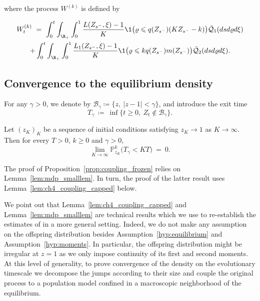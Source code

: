 \begin{refsegment}
where the process $ W^{(k)}$ is defined by

\begin{multline}\label{eq:martingale_before_cuting_in_three_parts} 
W^{(k)}_t\ =\ \int_0^t \int_{\R_+} \int_0^1 \frac{L(Z_{s^-},\xi)-1}{K}\1\big(\varrho \leqslant q({Z}_{s^-})(K{Z}_{s^-}-k)\big)\bar{\mathcal{Q}}_1( ds d\varrho d\xi)\\
   + \int_0^t \int_{\R_+} \int_0^1 \frac{L_1(Z_{s^-},\xi)-1}{K} \1\big(\varrho \leqslant k q({Z}_{s^-}) m({Z}_{s^-})\big)  \bar{\mathcal{Q}}_2( ds d\varrho d\xi).
\end{multline}


\subsection{Convergence to the equilibrium density}\label{sec:deviations}
For any $\gamma > 0$, we denote by $\mathscr{B}_{\gamma} \coloneqq \{z,\ |z-1|<\gamma\}$, and introduce the exit time
\begin{equation}\label{eq:stopping_times}
      T_{\gamma} \ \coloneqq\ \inf\big\{t\geqslant 0,\ {Z}_t\notin \mathscr{B}_{\gamma}\big\}.
\end{equation}

\begin{prop}\label{prop:coupling_frozen}
Let $(z_K)_{K}$ be a sequence of initial conditions satisfying $z_K\to 1$ as $K\to\infty$. Then for every $T>0$, $k\geqslant 0$ and $\gamma>0$,
\begin{equation*}
    \lim_{K\to\infty}\mathbb{P}^k_{z_K}(T_{\gamma}<KT\big)\  =\ 0.
\end{equation*}
\end{prop} 



The proof of Proposition~\ref{prop:coupling_frozen} relies on Lemma~\ref{lem:mdp_smalllem}. 
In turn, the proof of the latter result uses Lemma~\ref{lem:ch4_coupling_capped} below.
\begin{rem}\label{rem:technicalities}
    We point out that Lemma~\ref{lem:ch4_coupling_capped} and
    Lemma~\ref{lem:mdp_smalllem} are technical results which we use to
    re-establish the estimates of \cite{forien2025} in a more general
    setting. Indeed, we do not make any assumption on the offspring
    distribution besides Assumption~\ref{hyp:equilibrium} and Assumption~\ref{hyp:moments}.
    In particular, the offspring distribution might be irregular at $z=1$
    as we only impose continuity of its first and second moments. At this
    level of generality, to prove convergence of the density on the
    evolutionary timescale we decompose the jumps according to their size
    and couple the original process to a population model confined in a
    macroscopic neighborhood of the equilibrium.
\end{rem}



\end{refsegment}

